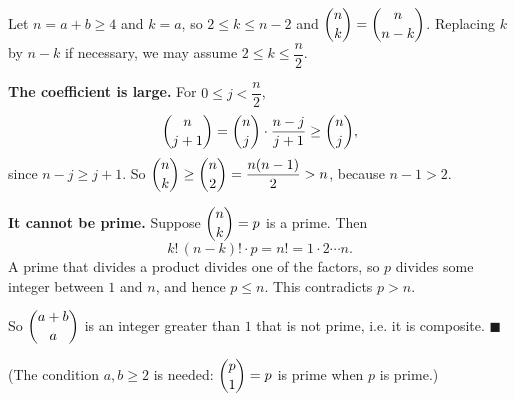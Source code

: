 Let $n=a+b\ge4$ and $k=a$, so $2\le k\le n-2$ and $\dbinom nk=\dbinom n{n-k}$. Replacing $k$ by $n-k$ if necessary, we may assume $2\le k\le\dfrac n2$.

\textbf{The coefficient is large.} For $0\le j<\dfrac n2$,
\[\dbinom n{j+1}=\dbinom nj\cdot\dfrac{n-j}{j+1}\ge\dbinom nj,\]
since $n-j\ge j+1$. So $\dbinom nk\ge\dbinom n2=\dfrac{n(n-1)}{2}>n$, because $n-1>2$.

\textbf{It cannot be prime.} Suppose $\dbinom nk=p$ is a prime. Then
\[k!\,(n-k)!\cdot p=n!=1\cdot2\cdots n.\]
A prime that divides a product divides one of the factors, so $p$ divides some integer between $1$ and $n$, and hence $p\le n$. This contradicts $p>n$.

So $\dbinom{a+b}{a}$ is an integer greater than $1$ that is not prime, i.e. it is composite. $\blacksquare$

(The condition $a,b\ge2$ is needed: $\dbinom{p}{1}=p$ is prime when $p$ is prime.)
